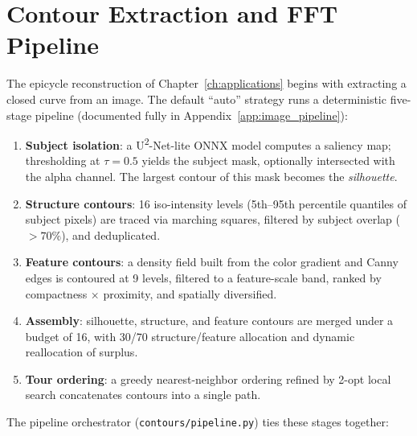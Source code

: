 \documentclass[12pt,a4paper]{report}
\theoremstyle{thms}
\theoremstyle{defns}
\begin{document}
\section{Contour Extraction and FFT Pipeline}
\label{app:contour_fft}

The epicycle reconstruction of Chapter~\ref{ch:applications} begins with extracting a closed curve from an image. The default ``auto'' strategy runs a deterministic five-stage pipeline (documented fully in Appendix~\ref{app:image_pipeline}):

\begin{enumerate}
    \item \textbf{Subject isolation}: a U\textsuperscript{2}-Net-lite ONNX model computes a saliency map; thresholding at $\tau = 0.5$ yields the subject mask, optionally intersected with the alpha channel. The largest contour of this mask becomes the \emph{silhouette}.
    \item \textbf{Structure contours}: 16 iso-intensity levels (5th--95th percentile quantiles of subject pixels) are traced via marching squares, filtered by subject overlap ($> 70\%$), and deduplicated.
    \item \textbf{Feature contours}: a density field built from the color gradient and Canny edges is contoured at 9 levels, filtered to a feature-scale band, ranked by compactness $\times$ proximity, and spatially diversified.
    \item \textbf{Assembly}: silhouette, structure, and feature contours are merged under a budget of 16, with 30/70 structure/feature allocation and dynamic reallocation of surplus.
    \item \textbf{Tour ordering}: a greedy nearest-neighbor ordering refined by 2-opt local search concatenates contours into a single path.
\end{enumerate}

The pipeline orchestrator (\texttt{contours/pipeline.py}) ties these stages together:
\end{document}
